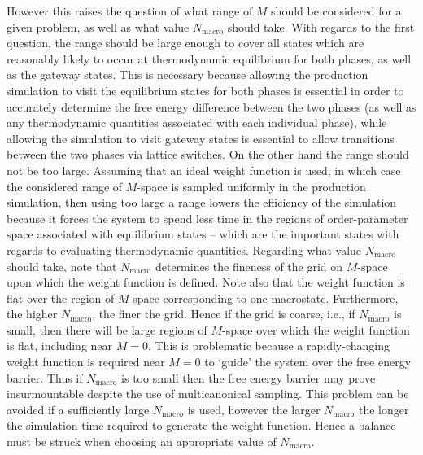 \documentclass{report}
\begin{document}
However this raises the question of what range of $M$ should be considered for a given problem, as well as what value $N_{\text{macro}}$ should take.
With regards to the first question, the range should be large enough to cover all states which are reasonably likely to occur at thermodynamic
equilibrium for both phases, as well as the gateway states. This is necessary because allowing the production simulation to visit the equilibrium states for 
both phases is essential in order to accurately determine the free energy difference between the two phases (as well as any thermodynamic quantities 
associated with each individual phase), while allowing the simulation to visit gateway states is essential to allow transitions between the two phases
via lattice switches. On the other hand the range should not be too large. Assuming that an ideal weight function is used, in which case the considered
range of $M$-space is sampled uniformly in the production simulation, then using too large a range lowers the efficiency of the simulation because 
it forces the system to spend less time in the regions of order-parameter space associated with equilibrium states -- which are the important states with
regards to evaluating thermodynamic quantities.
%
Regarding what value $N_{\text{macro}}$ should take, note that $N_{\text{macro}}$ determines the fineness of the grid on $M$-space upon which
the weight function is defined. Note also that the weight function is flat over the region of $M$-space corresponding to one macrostate. Furthermore, the higher 
$N_{\text{macro}}$, the finer the grid. Hence if the grid is coarse, i.e., if $N_{\text{macro}}$ is small, then there will be large regions of $M$-space
over which the weight function is flat, including near $M=0$. This is problematic because a rapidly-changing weight function is required near $M=0$ to 
`guide' the system over the free energy barrier. Thus if $N_{\text{macro}}$ is too small then the free energy barrier may prove insurmountable despite the
use of multicanonical sampling. This problem can be avoided if a sufficiently large $N_{\text{macro}}$ is used, however the larger $N_{\text{macro}}$ the
longer the simulation time required to generate the weight function. Hence a balance must be struck when choosing an appropriate value of $N_{\text{macro}}$.
\end{document}
